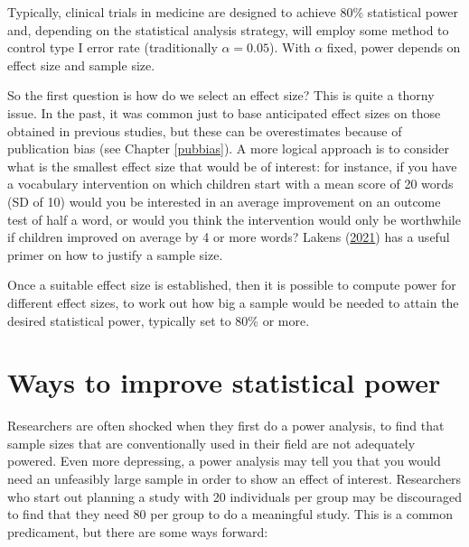 \documentclass{krantz}
\begin{document}
Typically, clinical trials in medicine are designed to achieve 80\% statistical power and, depending on the statistical analysis strategy, will employ some method to control type I error rate (traditionally \(\alpha=0.05\)). With \(\alpha\) fixed, power depends on effect size and sample size.

So the first question is how do we select an effect size? This is quite a thorny issue. In the past, it was common just to base anticipated effect sizes on those obtained in previous studies, but these can be overestimates because of publication bias (see Chapter \ref{pubbias}). A more logical approach is to consider what is the smallest effect size that would be of interest: for instance, if you have a vocabulary intervention on which children start with a mean score of 20 words (SD of 10) would you be interested in an average improvement on an outcome test of half a word, or would you think the intervention would only be worthwhile if children improved on average by 4 or more words? Lakens (\protect\hyperlink{ref-lakens2021}{2021}) has a useful primer on how to justify a sample size.

Once a suitable effect size is established, then it is possible to compute power for different effect sizes, to work out how big a sample would be needed to attain the desired statistical power, typically set to 80\% or more.

\hypertarget{ways-to-improve-statistical-power}{%
\section{Ways to improve statistical power}\label{ways-to-improve-statistical-power}}

Researchers are often shocked when they first do a power analysis, to find that sample sizes that are conventionally used in their field are not adequately powered. Even more depressing, a power analysis may tell you that you would need an unfeasibly large sample in order to show an effect of interest. Researchers who start out planning a study with 20 individuals per group may be discouraged to find that they need 80 per group to do a meaningful study. This is a common predicament, but there are some ways forward:
\end{document}
